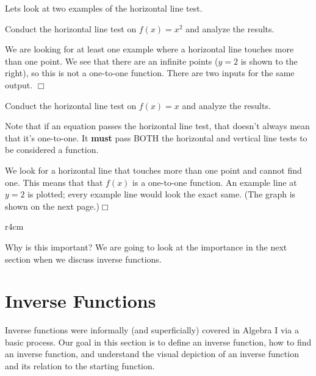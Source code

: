 \documentclass[lang=en,11pt]{elegantbook}
\begin{document}
Lets look at two examples of the horizontal line test.
\begin{example}
Conduct the horizontal line test on $f(x)=x^2$ and analyze the results.
\end{example}
\begin{solution}
We are looking for at least one example where a horizontal line touches more than one point.  We see that there are an infinite points ($y=2$ is shown to the right), so this is not a one-to-one function.  There are two inputs for the same output.  $\Box$
\end{solution}
\begin{example}
Conduct the horizontal line test on $f(x)=x$ and analyze the results.
\end{example}
\begin{remark}
  Note that if an equation passes the horizontal line test, that doesn't always mean that it's one-to-one.  It \textbf{must} pass BOTH the horizontal and vertical line tests to be considered a function.
\end{remark}
\begin{solution}
We look for a horizontal line that touches more than one point and cannot find one.  This means that that $f(x)$ is a one-to-one function.  An example line at $y=2$ is plotted; every example line would look the exact same.  (The graph is shown on the next page.)$\Box$
\end{solution}
\newpage
\begin{wrapfigure}{r}{4cm}
\end{wrapfigure}
Why is this important?  We are going to look at the importance in the next section when we discuss inverse functions.
\section{Inverse Functions}
\noindent Inverse functions were informally (and superficially) covered in Algebra I via a basic process.  Our goal in this section is to define an inverse function, how to find an inverse function, and understand the visual depiction of an inverse function and its relation to the starting function.
\end{document}
